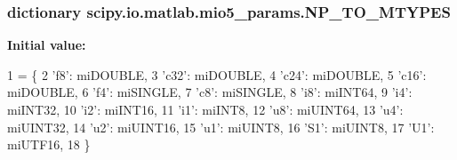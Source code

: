 \subsubsection[{N\+P\+\_\+\+T\+O\+\_\+\+M\+T\+Y\+P\+E\+S}]{\setlength{\rightskip}{0pt plus 5cm}dictionary scipy.\+io.\+matlab.\+mio5\+\_\+params.\+N\+P\+\_\+\+T\+O\+\_\+\+M\+T\+Y\+P\+E\+S}\label{namespacescipy_1_1io_1_1matlab_1_1mio5__params_ac11e31b9c520336e9b1fac3650302094}
{\bfseries Initial value\+:}
\begin{DoxyCode}
1 = \{
2     \textcolor{stringliteral}{'f8'}: miDOUBLE,
3     \textcolor{stringliteral}{'c32'}: miDOUBLE,
4     \textcolor{stringliteral}{'c24'}: miDOUBLE,
5     \textcolor{stringliteral}{'c16'}: miDOUBLE,
6     \textcolor{stringliteral}{'f4'}: miSINGLE,
7     \textcolor{stringliteral}{'c8'}: miSINGLE,
8     \textcolor{stringliteral}{'i8'}: miINT64,
9     \textcolor{stringliteral}{'i4'}: miINT32,
10     \textcolor{stringliteral}{'i2'}: miINT16,
11     \textcolor{stringliteral}{'i1'}: miINT8,
12     \textcolor{stringliteral}{'u8'}: miUINT64,
13     \textcolor{stringliteral}{'u4'}: miUINT32,
14     \textcolor{stringliteral}{'u2'}: miUINT16,
15     \textcolor{stringliteral}{'u1'}: miUINT8,
16     \textcolor{stringliteral}{'S1'}: miUINT8,
17     \textcolor{stringliteral}{'U1'}: miUTF16,
18     \}
\end{DoxyCode}
\hypertarget{namespacescipy_1_1io_1_1matlab_1_1mio5__params_aaeddecfc026604340fa79525ea8423b6}{}
